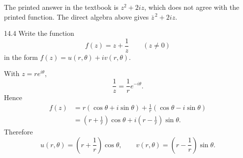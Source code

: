 \documentclass[11pt,oneside]{article}
\begin{document}
\begin{remark}
The printed answer in the textbook is \(z^2+2iz\), which does not agree with the printed function. The direct algebra above gives \(\overline z^{\,2}+2iz\).
\end{remark}

\begin{exercise}{14.4}
Write the function
\[
    f(z)=z+\frac1z
    \qquad(z\ne0)
\]
in the form \(f(z)=u(r, \theta)+iv(r, \theta)\).
\end{exercise}

\begin{solution}
With \(z=re^{i\theta}\),
\[
    \frac1z=\frac1r e^{-i\theta}.
\]
Hence
\[
\begin{aligned}
    f(z)
    &=r(\cos\theta+i\sin\theta)
      +\frac1r(\cos\theta-i\sin\theta)\\
    &=\left(r+\frac1r\right)\cos\theta
      +i\left(r-\frac1r\right)\sin\theta.
\end{aligned}
\]
Therefore
\[
    \boxed{
    u(r, \theta)=\left(r+\frac1r\right)\cos\theta,
    \qquad
    v(r, \theta)=\left(r-\frac1r\right)\sin\theta
    }.
\]
\end{solution}
\end{document}
